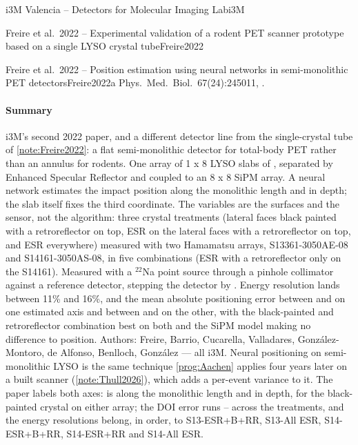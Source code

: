 \begin{programnote}{i3M Valencia -- Detectors for Molecular Imaging Lab}{i3M}
\begin{papernote}{Freire et al.\ 2022 -- Experimental validation of a rodent PET scanner prototype based on a single LYSO crystal tube}{Freire2022}
\end{papernote}

\begin{papernote}{Freire et al.\ 2022 -- Position estimation using neural networks in semi-monolithic PET detectors}{Freire2022a}
Phys.\ Med.\ Biol.\ 67(24):245011, .

\paragraph{Summary}
i3M's second 2022 paper, and a different detector line from the single-crystal
tube of \ref{note:Freire2022}: a flat semi-monolithic detector for total-body PET
rather than an annulus for rodents. One array of 1 x 8 LYSO slabs of
, separated by Enhanced Specular
Reflector and coupled to an 8 x 8 SiPM array. A neural network estimates the
impact position along the monolithic length and in depth; the slab itself
fixes the third coordinate. The variables are the surfaces and the sensor,
not the algorithm: three crystal treatments (lateral faces black painted with
a retroreflector on top, ESR on the lateral faces with a retroreflector on
top, and ESR everywhere) measured with two Hamamatsu arrays, S13361-3050AE-08
and S14161-3050AS-08, in five combinations (ESR with a retroreflector
only on the S14161). Measured with a $^{22}$Na point source through a
pinhole collimator against a reference detector, stepping the detector by
. Energy resolution lands between 11\% and 16\%, and the mean absolute
positioning error between  and  on one
estimated axis and between  and  on the
other, with the black-painted and retroreflector combination best on both and
the SiPM model making no difference to position. Authors: Freire, Barrio,
Cucarella, Valladares, González-Montoro, de Alfonso, Benlloch, González ---
all i3M. Neural positioning on semi-monolithic LYSO is the same technique
\ref{prog:Aachen} applies four years later on a built scanner
(\ref{note:Thull2026}), which adds a per-event variance to it.
The paper labels both axes:  is along the monolithic length and
 in depth, for the black-painted crystal on either array; the DOI
error runs -- across the treatments, and the energy
resolutions belong, in order, to S13-ESR+B+RR, S13-All ESR, S14-ESR+B+RR,
S14-ESR+RR and S14-All ESR.


\end{papernote}
\end{programnote}
